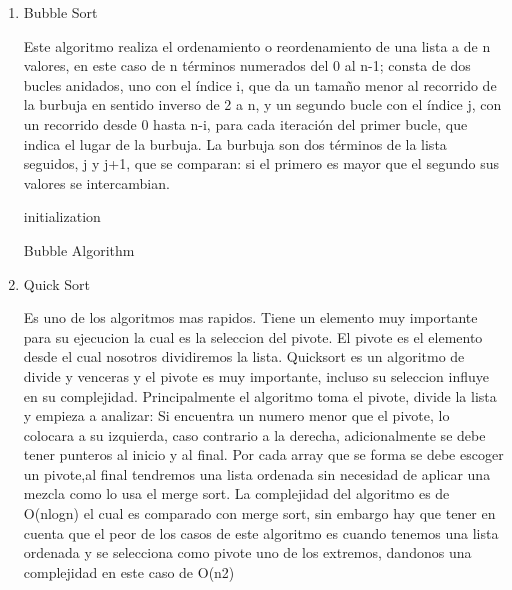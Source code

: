 \documentclass[12pt]{article} %
\begin{document}
\begin{enumerate}
    \item Bubble Sort
    
          Este algoritmo realiza el ordenamiento o reordenamiento de una lista a de n valores, en este caso de n términos numerados del 0 al n-1; consta de dos bucles anidados, uno con el índice i, que da un tamaño menor al recorrido de la burbuja en sentido inverso de 2 a n, y un segundo bucle con el índice j,
          con un recorrido desde 0 hasta n-i, para cada iteración del primer bucle, que indica el lugar de la burbuja. La burbuja son dos términos de la lista seguidos, j y j+1, que se comparan: si el primero es mayor que el segundo sus valores se intercambian.

          \begin{algorithm}[H]
              initialization\;
              \caption{Bubble Algorithm}
          \end{algorithm}

    \item Quick Sort
    
          Es uno de los algoritmos mas rapidos. Tiene un elemento muy importante para su ejecucion la cual es la seleccion del pivote. El pivote es el elemento desde el cual nosotros dividiremos la lista.
          Quicksort es un algoritmo de divide y venceras y el pivote es muy importante, incluso su seleccion influye en su complejidad. Principalmente el algoritmo toma el pivote, divide la lista y empieza a analizar:
          Si encuentra un numero menor que el pivote, lo colocara a su izquierda, caso contrario a la derecha, adicionalmente se debe tener punteros al inicio y al final.
          Por cada array que se forma se debe escoger un pivote,al final tendremos una lista ordenada sin necesidad de aplicar una mezcla como lo usa el merge sort.
          La complejidad del algoritmo es de O(nlogn) el cual es comparado con merge sort, sin embargo hay que tener en cuenta que el peor de los casos de este algoritmo es cuando
          tenemos una lista ordenada y se selecciona como pivote uno de los extremos, dandonos una complejidad en este caso de O(n2)


\end{enumerate}
\end{document}
